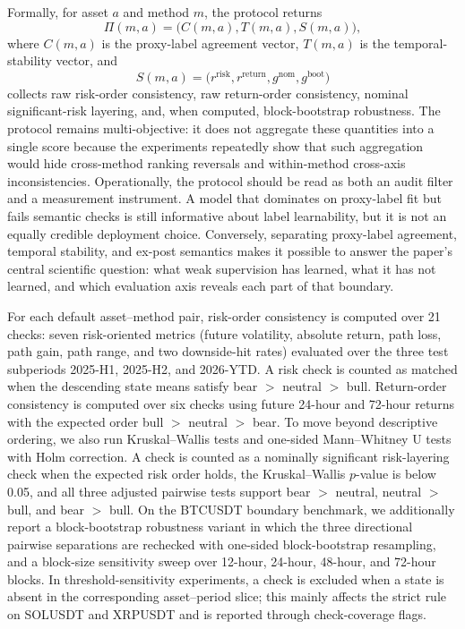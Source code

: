 \documentclass[a4paper,fleqn]{cas-dc}
\begin{document}
Formally, for asset $a$ and method $m$, the protocol returns
\[
\Pi(m,a)=\big(C(m,a),T(m,a),S(m,a)\big),
\]
where $C(m,a)$ is the proxy-label agreement vector, $T(m,a)$ is the temporal-stability vector, and
\[
S(m,a)=\big(r^{\mathrm{risk}},r^{\mathrm{return}},g^{\mathrm{nom}},g^{\mathrm{boot}}\big)
\]
collects raw risk-order consistency, raw return-order consistency, nominal significant-risk layering, and, when computed, block-bootstrap robustness. The protocol remains multi-objective: it does not aggregate these quantities into a single score because the experiments repeatedly show that such aggregation would hide cross-method ranking reversals and within-method cross-axis inconsistencies. Operationally, the protocol should be read as both an audit filter and a measurement instrument. A model that dominates on proxy-label fit but fails semantic checks is still informative about label learnability, but it is not an equally credible deployment choice. Conversely, separating proxy-label agreement, temporal stability, and ex-post semantics makes it possible to answer the paper's central scientific question: what weak supervision has learned, what it has not learned, and which evaluation axis reveals each part of that boundary.

For each default asset--method pair, risk-order consistency is computed over 21 checks: seven risk-oriented metrics (future volatility, absolute return, path loss, path gain, path range, and two downside-hit rates) evaluated over the three test subperiods 2025-H1, 2025-H2, and 2026-YTD. A risk check is counted as matched when the descending state means satisfy bear $>$ neutral $>$ bull. Return-order consistency is computed over six checks using future 24-hour and 72-hour returns with the expected order bull $>$ neutral $>$ bear. To move beyond descriptive ordering, we also run Kruskal--Wallis tests and one-sided Mann--Whitney U tests with Holm correction. A check is counted as a nominally significant risk-layering check when the expected risk order holds, the Kruskal--Wallis $p$-value is below 0.05, and all three adjusted pairwise tests support bear $>$ neutral, neutral $>$ bull, and bear $>$ bull. On the BTCUSDT boundary benchmark, we additionally report a block-bootstrap robustness variant in which the three directional pairwise separations are rechecked with one-sided block-bootstrap resampling, and a block-size sensitivity sweep over 12-hour, 24-hour, 48-hour, and 72-hour blocks. In threshold-sensitivity experiments, a check is excluded when a state is absent in the corresponding asset--period slice; this mainly affects the strict rule on SOLUSDT and XRPUSDT and is reported through check-coverage flags.
\end{document}

